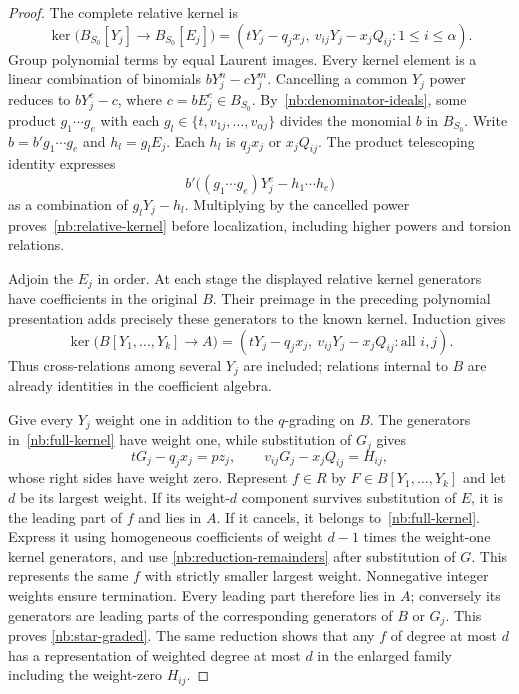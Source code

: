 \begin{proof}
The complete relative kernel is
\begin{equation}\label{nb:relative-kernel}
 \ker\bigl(B_{S_0}[Y_j]\longrightarrow B_{S_0}[E_j]\bigr)
 =(tY_j-q_jx_j,\ v_{ij}Y_j-x_jQ_{ij}:1\leq i\leq\alpha).
\end{equation}
Group polynomial terms by equal Laurent images. Every kernel element
is a linear combination of binomials $bY_j^n-cY_j^m$. Cancelling
a common $Y_j$ power reduces to $bY_j^e-c$, where
$c=bE_j^e\in B_{S_0}$. By~\eqref{nb:denominator-ideals}, some
product $g_1\cdots g_e$ with each $g_l\in\{t,v_{1j},\ldots,
v_{\alpha j}\}$ divides the monomial $b$ in $B_{S_0}$.
Write $b=b'g_1\cdots g_e$ and $h_l=g_lE_j$. Each $h_l$ is
$q_jx_j$ or $x_jQ_{ij}$. The product telescoping identity expresses
\[
 b'\bigl((g_1\cdots g_e)Y_j^e-h_1\cdots h_e\bigr)
\]
as a combination of $g_lY_j-h_l$. Multiplying by the cancelled
power proves~\eqref{nb:relative-kernel} before localization,
including higher powers and torsion relations.

Adjoin the $E_j$ in order. At each stage the displayed relative
kernel generators have coefficients in the original $B$. Their
preimage in the preceding polynomial presentation adds precisely
these generators to the known kernel. Induction gives
\begin{equation}\label{nb:full-kernel}
 \ker\bigl(B[Y_1,\ldots,Y_k]\longrightarrow A\bigr)
 =(tY_j-q_jx_j,\ v_{ij}Y_j-x_jQ_{ij}:\text{all }i,j).
\end{equation}
Thus cross-relations among several $Y_j$ are included; relations
internal to $B$ are already identities in the coefficient algebra.

Give every $Y_j$ weight one in addition to the $q$-grading on $B$.
The generators in~\eqref{nb:full-kernel} have weight one, while
substitution of $G_j$ gives
\begin{equation}\label{nb:reduction-remainders}
 tG_j-q_jx_j=pz_j,\qquad v_{ij}G_j-x_jQ_{ij}=H_{ij},
\end{equation}
whose right sides have weight zero. Represent $f\in R$ by
$F\in B[Y_1,\ldots,Y_k]$ and let $d$ be its largest weight.
If its weight-$d$ component survives substitution of $E$, it is
the leading part of $f$ and lies in $A$. If it cancels, it belongs
to~\eqref{nb:full-kernel}. Express it using homogeneous coefficients
of weight $d-1$ times the weight-one kernel generators, and use
\eqref{nb:reduction-remainders} after substitution of $G$. This
represents the same $f$ with strictly smaller largest weight.
Nonnegative integer weights ensure termination. Every leading part
therefore lies in $A$; conversely its generators are leading parts
of the corresponding generators of $B$ or $G_j$. This proves
\eqref{nb:star-graded}. The same reduction shows that any $f$ of
degree at most $d$ has a representation of weighted degree at most
$d$ in the enlarged family including the weight-zero $H_{ij}$.


\end{proof}

